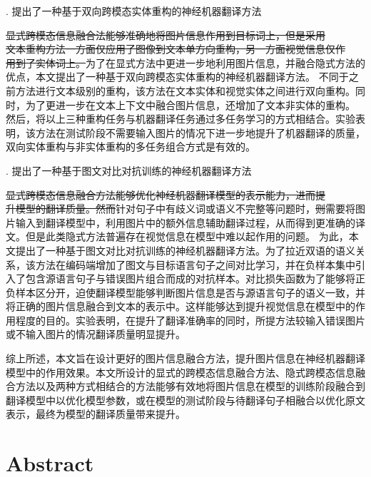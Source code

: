 {. 提出了一种基于双向跨模态实体重构的神经机器翻译方法}

\sout{显式跨模态信息融合法能够准确地将图片信息作用到目标词上，但是采用}\\\sout{文本重构方法一方面仅应用了图像到文本单方向重构，另一方面视觉信息仅作}\\\sout{用到了实体词上。}为了在显式方法中更进一步地利用图片信息，并融合隐式方法的优点，本文提出了一种基于双向跨模态实体重构的神经机器翻译方法。
不同于之前方法进行文本级别的重构，该方法在文本实体和视觉实体之间进行双向重构。同时，为了更进一步在文本上下文中融合图片信息，还增加了文本非实体的重构。%
然后，将以上三种重构任务与机器翻译任务通过多任务学习的方式相结合。实验表明，该方法在测试阶段不需要输入图片的情况下进一步地提升了机器翻译的质量，双向实体重构与非实体重构的多任务组合方式是有效的。

{. 提出了一种基于图文对比对抗训练的神经机器翻译方法}

\sout{显式跨模态信息融合方法能够优化神经机器翻译模型的表示能力，进而提} \\ \sout{升模型的翻译质量。然而}针对句子中有歧义词或语义不完整等问题时，\sout{则}需要将图片输入到翻译模型中，利用图片中的额外信息辅助翻译过程，从而得到更准确的译文。但是此类隐式方法普遍存在视觉信息在模型中难以起作用的问题。
为此，本文提出了一种基于图文对比对抗训练的神经机器翻译方法。为了拉近双语的语义关系，该方法在编码端增加了图文与目标语言句子之间对比学习，并在负样本集中引入了包含源语言句子与错误图片组合而成的对抗样本。对比损失函数为了能够将正负样本区分开，迫使翻译模型能够判断图片信息是否与源语言句子的语义一致，并将正确的图片信息融合到文本的表示中。这样能够达到提升视觉信息在模型中的作用程度的目的。实验表明，在提升了翻译准确率的同时，所提方法较输入错误图片或不输入图片的情况翻译质量明显提升。

综上所述，本文旨在设计更好的图片信息融合方法，提升图片信息在神经机器翻译模型中的作用效果。本文所设计的显式的跨模态信息融合方法、隐式跨模态信息融合方法以及两种方式相结合的方法能够有效地将图片信息在模型的训练阶段融合到翻译模型中以优化模型参数，或在模型的测试阶段与待翻译句子相融合以优化原文表示，最终为模型的翻译质量带来提升。

\intobmk\chapter*{Abstract}%

